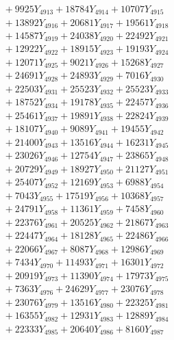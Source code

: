 \documentclass[a4paper,10pt]{article}
\begin{document}
{\begin{align}
&\;  + 9925 Y_{4913} + 18784 Y_{4914} + 10707 Y_{4915} \\[0.3ex]
&\;  + 13892 Y_{4916} + 20681 Y_{4917} + 19561 Y_{4918} \\[0.5ex]\allowbreak
&\;  + 14587 Y_{4919} + 24038 Y_{4920} + 22492 Y_{4921} \\[0.3ex]
&\;  + 12922 Y_{4922} + 18915 Y_{4923} + 19193 Y_{4924} \\[0.3ex]
&\;  + 12071 Y_{4925} + 9021 Y_{4926} + 15268 Y_{4927} \\[0.3ex]
&\;  + 24691 Y_{4928} + 24893 Y_{4929} + 7016 Y_{4930} \\[0.3ex]
&\;  + 22503 Y_{4931} + 25523 Y_{4932} + 25523 Y_{4933} \\[0.3ex]
&\;  + 18752 Y_{4934} + 19178 Y_{4935} + 22457 Y_{4936} \\[0.3ex]
&\;  + 25461 Y_{4937} + 19891 Y_{4938} + 22824 Y_{4939} \\[0.3ex]
&\;  + 18107 Y_{4940} + 9089 Y_{4941} + 19455 Y_{4942} \\[0.3ex]
&\;  + 21400 Y_{4943} + 13516 Y_{4944} + 16231 Y_{4945} \\[0.3ex]
&\;  + 23026 Y_{4946} + 12754 Y_{4947} + 23865 Y_{4948} \\[0.5ex]\allowbreak
&\;  + 20729 Y_{4949} + 18927 Y_{4950} + 21127 Y_{4951} \\[0.3ex]
&\;  + 25407 Y_{4952} + 12169 Y_{4953} + 6988 Y_{4954} \\[0.3ex]
&\;  + 7043 Y_{4955} + 17519 Y_{4956} + 10368 Y_{4957} \\[0.3ex]
&\;  + 24791 Y_{4958} + 11361 Y_{4959} + 7458 Y_{4960} \\[0.3ex]
&\;  + 22376 Y_{4961} + 20525 Y_{4962} + 21867 Y_{4963} \\[0.3ex]
&\;  + 22447 Y_{4964} + 18128 Y_{4965} + 22486 Y_{4966} \\[0.3ex]
&\;  + 22066 Y_{4967} + 8087 Y_{4968} + 12986 Y_{4969} \\[0.3ex]
&\;  + 7434 Y_{4970} + 11493 Y_{4971} + 16301 Y_{4972} \\[0.3ex]
&\;  + 20919 Y_{4973} + 11390 Y_{4974} + 17973 Y_{4975} \\[0.3ex]
&\;  + 7363 Y_{4976} + 24629 Y_{4977} + 23076 Y_{4978} \\[0.5ex]\allowbreak
&\;  + 23076 Y_{4979} + 13516 Y_{4980} + 22325 Y_{4981} \\[0.3ex]
&\;  + 16355 Y_{4982} + 12931 Y_{4983} + 12889 Y_{4984} \\[0.3ex]
&\;  + 22333 Y_{4985} + 20640 Y_{4986} + 8160 Y_{4987} \\[0.3ex]

\end{align}}
\end{document}
